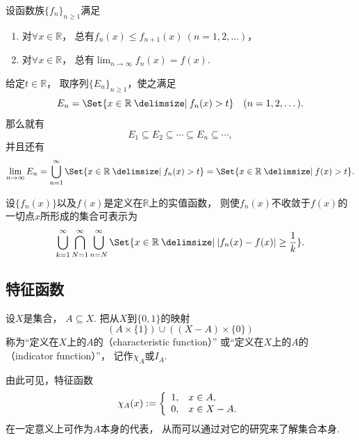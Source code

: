 \begin{example}
设函数族\(\{f_n\}_{n\geq1}\)满足
\begin{enumerate}
	\item 对\(\forall x\in\mathbb{R}\)，
	总有\(f_n(x) \leq f_{n+1}(x)\ (n=1,2,\dotsc)\)，
	\item 对\(\forall x\in\mathbb{R}\)，
	总有\(\lim_{n\to\infty} f_n(x) = f(x)\).
\end{enumerate}
给定\(t\in\mathbb{R}\)，
取序列\(\{E_n\}_{n\geq1}\)，使之满足\begin{equation*}
	E_n = \Set{ x\in\mathbb{R} \given f_n(x) > t }
	\quad(n=1,2,\dotsc).
\end{equation*}
那么就有\begin{equation*}
	E_1 \subseteq E_2 \subseteq \dotsb \subseteq E_n \subseteq \dotsb,
\end{equation*}
并且还有\begin{equation*}
	\lim_{n\to\infty} E_n
	= \bigcup_{n=1}^\infty \Set{ x\in\mathbb{R} \given f_n(x) > t }
	= \Set{ x\in\mathbb{R} \given f(x) > t }.
\end{equation*}
\end{example}

\begin{proposition}
设\(\{f_n(x)\}\)以及\(f(x)\)是定义在\(\mathbb{R}\)上的实值函数，
则使\(f_n(x)\)不收敛于\(f(x)\)的一切点\(x\)所形成的集合可表示为\begin{equation*}
	\bigcup_{k=1}^\infty
	\bigcap_{N=1}^\infty
	\bigcup_{n=N}^\infty
	\Set{
		x\in\mathbb{R}
		\given
		\abs{f_n(x) - f(x)} \geq \frac1k
	}.
\end{equation*}
\end{proposition}

\subsection{特征函数}
\begin{definition}
设\(X\)是集合，
\(A \subseteq X\).
把从\(X\)到\(\{0,1\}\)的映射\begin{equation*}
	(A \times \{1\})
	\cup
	((X - A) \times \{0\})
\end{equation*}
称为“定义在\(X\)上的\(A\)的（characteristic function）”
或“定义在\(X\)上的\(A\)的（indicator function）”，
记作\(\chi_A\)或\(I_A\).
\end{definition}
由此可见，特征函数\begin{equation*}
	\chi_A(x)
	:=
	\left\{ \begin{array}{cl}
		1, & x \in A, \\
		0, & x \in X - A.
	\end{array} \right.
\end{equation*}
在一定意义上可作为\(A\)本身的代表，
从而可以通过对它的研究来了解集合本身.

